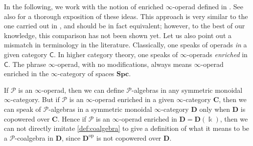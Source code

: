 \documentclass{proc-l}
\theoremstyle{plain}
\theoremstyle{definition}
\theoremstyle{remark}
\newcommand{\kk}{\Bbbk}
\begin{document}
In the following, we work with the notion of enriched $\infty$-operad defined in \cite[Section 4.1.2]{BrantnerPhD}. See also \cite[Section 5.2.4]{ShiPhD} for a thorough exposition of these ideas. This approach is very similar to the one carried out in \cite{Haugseng}, and should be in fact equivalent; however, to the best of our knowledge, this comparison has not been shown yet. Let us also point out a mismatch in terminology in the literature. Classically, one speaks of operads \emph{in} a given category $\mathsf C$. In higher category theory, one speaks of $\infty$-operads \emph{enriched} in $\mathsf C$. The phrase $\infty$-operad, with no modifications, always means $\infty$-operad enriched in the $\infty$-category of spaces $\mathbf {Spc}$.

If $\mathscr P$ is an $\infty$-operad, then we can define $\mathscr P$-algebras in any symmetric monoidal $\infty$-category. But if $\mathscr P$ is an $\infty$-operad enriched in a given $\infty$-category $\mathbf C$, then we can speak of $\mathscr P$-algebras in a symmetric monoidal $\infty$-category $\mathbf D$ only when $\mathbf D$ is copowered over $\mathbf C$. Hence if $\mathscr P$ is an $\infty$-operad enriched in $\mathbf D = \mathbf D(\kk)$, then we can not directly imitate \cref{def:coalgebra} to give a definition of what it means to be a $\mathscr P$-coalgebra in $\mathbf D$, since $\mathbf D^{\mathrm{op}}$ is not copowered over $\mathbf D$.
\end{document}
